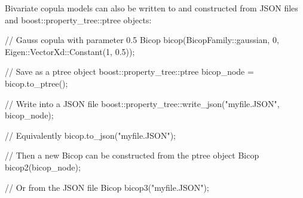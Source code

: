 Bivariate copula models can also be written to and constructed from J\+S\+ON files and {\ttfamily boost\+::property\+\_\+tree\+::ptree} objects\+:


\begin{DoxyCode}
\textcolor{comment}{// Gauss copula with parameter 0.5}
Bicop bicop(BicopFamily::gaussian, 0,  Eigen::VectorXd::Constant(1, 0.5));

\textcolor{comment}{// Save as a ptree object}
boost::property\_tree::ptree bicop\_node = bicop.to\_ptree();

\textcolor{comment}{// Write into a JSON file}
boost::property\_tree::write\_json(\textcolor{stringliteral}{"myfile.JSON"}, bicop\_node);

\textcolor{comment}{// Equivalently}
bicop.to\_json(\textcolor{stringliteral}{"myfile.JSON"});

\textcolor{comment}{// Then a new Bicop can be constructed from the ptree object}
Bicop bicop2(bicop\_node);

\textcolor{comment}{// Or from the JSON file}
Bicop bicop3(\textcolor{stringliteral}{"myfile.JSON"});
\end{DoxyCode}
 